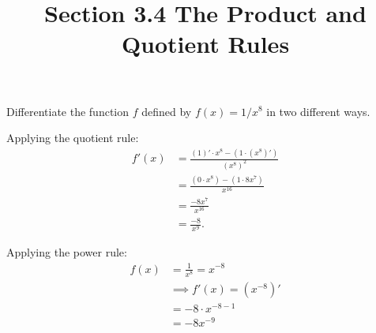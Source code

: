 \documentclass[nooutcomes, handout]{ximera}
\title{Section 3.4 The Product and Quotient Rules}
\begin{document}
\begin{abstract}		\end{abstract}
\maketitle

\begin{problem}
 Differentiate the function $f$ defined by $f(x) = 1/x^8$ in two different ways.
  \begin{freeResponse}
    Applying the quotient rule:
    \begin{align*}
      f'(x) &= \frac{(1)' \cdot x^8 - (1 \cdot (x^8)')}{(x^8)^2} \\
            &= \frac{(0 \cdot x^8) - (1 \cdot 8x^7)}{x^{16}} \\
            &= \frac{-8x^7}{x^{16}}\\
            &= \frac{-8}{x^9}. 
    \end{align*}

  Applying the power rule:
  \begin{align*}
    f(x) &= \frac{1}{x^8} = x^{-8}\\
    &\implies f'(x) = (x^{-8})'\\
    &= -8\cdot x^{-8 -1}\\
    &= -8x^{-9}
  \end{align*}
  \end{freeResponse}
\end{problem}
	
\end{document}
